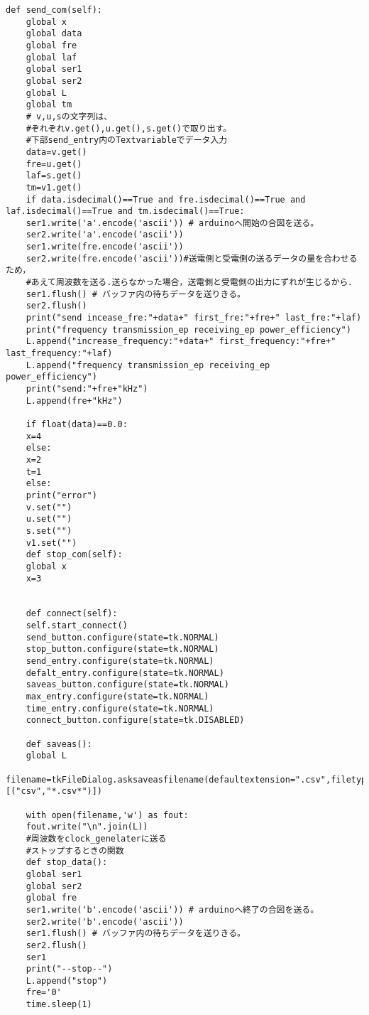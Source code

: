\documentclass[12pt]{jarticle}
\begin{document}
\begin{lstlisting}[caption = GUIプログラム , label = program1]
	def send_com(self):
	global x
	global data
	global fre
	global laf
	global ser1
	global ser2
	global L
	global tm
	# v,u,sの文字列は、
	#ぞれぞれv.get(),u.get(),s.get()で取り出す。
	#下部send_entry内のTextvariableでデータ入力
	data=v.get()
	fre=u.get() 
	laf=s.get()
	tm=v1.get() 
	if data.isdecimal()==True and fre.isdecimal()==True and laf.isdecimal()==True and tm.isdecimal()==True:
	ser1.write('a'.encode('ascii')) # arduinoへ開始の合図を送る。
	ser2.write('a'.encode('ascii'))
	ser1.write(fre.encode('ascii'))
	ser2.write(fre.encode('ascii'))#送電側と受電側の送るデータの量を合わせるため，
	#あえて周波数を送る.送らなかった場合，送電側と受電側の出力にずれが生じるから．
	ser1.flush() # バッファ内の待ちデータを送りきる。
	ser2.flush()
	print("send incease_fre:"+data+" first_fre:"+fre+" last_fre:"+laf)
	print("frequency transmission_ep receiving_ep power_efficiency")
	L.append("increase_frequency:"+data+" first_frequency:"+fre+" last_frequency:"+laf)
	L.append("frequency transmission_ep receiving_ep power_efficiency")
	print("send:"+fre+"kHz")
	L.append(fre+"kHz")
	
	if float(data)==0.0:
	x=4
	else:
	x=2
	t=1
	else:
	print("error")
	v.set("")
	u.set("")
	s.set("")
	v1.set("")
	def stop_com(self):
	global x
	x=3
	
	
	def connect(self):
	self.start_connect()
	send_button.configure(state=tk.NORMAL)
	stop_button.configure(state=tk.NORMAL)
	send_entry.configure(state=tk.NORMAL)
	defalt_entry.configure(state=tk.NORMAL)
	saveas_button.configure(state=tk.NORMAL)
	max_entry.configure(state=tk.NORMAL)
	time_entry.configure(state=tk.NORMAL)
	connect_button.configure(state=tk.DISABLED)
	
	def saveas():
	global L
	filename=tkFileDialog.asksaveasfilename(defaultextension=".csv",filetypes=[("csv","*.csv*")])
	
	with open(filename,'w') as fout:
	fout.write("\n".join(L))
	#周波数をclock_genelaterに送る
	#ストップするときの関数
	def stop_data():
	global ser1
	global ser2
	global fre
	ser1.write('b'.encode('ascii')) # arduinoへ終了の合図を送る。
	ser2.write('b'.encode('ascii'))
	ser1.flush() # バッファ内の待ちデータを送りきる。
	ser2.flush()
	ser1
	print("--stop--")
	L.append("stop")
	fre='0'
	time.sleep(1)
	

\end{lstlisting}
\end{document}

